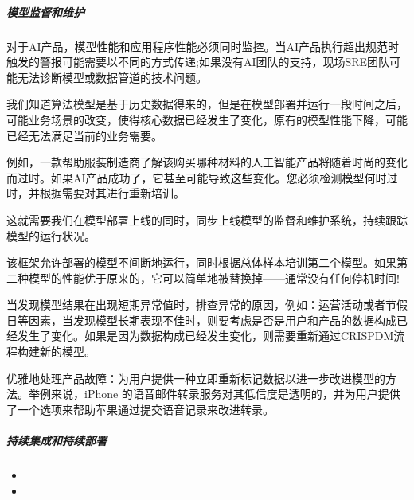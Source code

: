 \documentclass[letterpaper,10pt,english]{sphinxmanual}
\begin{document}
\subparagraph{模型监督和维护}
\label{\detokenize{chapter_project/process:id32}}
对于AI产品，模型性能和应用程序性能必须同时监控。当AI产品执行超出规范时触发的警报可能需要以不同的方式传递;如果没有AI团队的支持，现场SRE团队可能无法诊断模型或数据管道的技术问题。

我们知道算法模型是基于历史数据得来的，但是在模型部署并运行一段时间之后，可能业务场景的改变，使得核心数据已经发生了变化，原有的模型性能下降，可能已经无法满足当前的业务需要。
%
\begin{footnote}[802]\sphinxAtStartFootnote
{}
%
\end{footnote}

例如，一款帮助服装制造商了解该购买哪种材料的人工智能产品将随着时尚的变化而过时。如果AI产品成功了，它甚至可能导致这些变化。您必须检测模型何时过时，并根据需要对其进行重新培训。

这就需要我们在模型部署上线的同时，同步上线模型的监督和维护系统，持续跟踪模型的运行状况。

该框架允许部署的模型不间断地运行，同时根据总体样本培训第二个模型。如果第二种模型的性能优于原来的，它可以简单地被替换掉——通常没有任何停机时间!

当发现模型结果在出现短期异常值时，排查异常的原因，例如：运营活动或者节假日等因素，当发现模型长期表现不佳时，则要考虑是否是用户和产品的数据构成已经发生了变化。如果是因为数据构成已经发生变化，则需要重新通过CRISP\sphinxhyphen{}DM流程构建新的模型。

优雅地处理产品故障：为用户提供一种立即重新标记数据以进一步改进模型的方法。举例来说，iPhone
的语音邮件转录服务对其低信度是透明的，并为用户提供了一个选项来帮助苹果通过提交语音记录来改进转录。%
\begin{footnote}[803]\sphinxAtStartFootnote
{}
%
\end{footnote}


\subparagraph{持续集成和持续部署}
\label{\detokenize{chapter_project/process:id33}}\begin{itemize}
\item {} 

\item {} 

\end{itemize}
\end{document}
